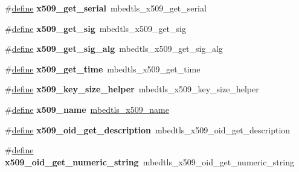 \begin{DoxyCompactItemize}
\item 
\mbox{\label{compat-1_83_8h_adda3ad994d9d311903524d777c44c93f}} 
\#\hyperlink{structdefine}{define} {\bfseries x509\+\_\+get\+\_\+serial}~mbedtls\+\_\+x509\+\_\+get\+\_\+serial
\item 
\mbox{\label{compat-1_83_8h_a9821ad162d9337ad1591910592a180b2}} 
\#\hyperlink{structdefine}{define} {\bfseries x509\+\_\+get\+\_\+sig}~mbedtls\+\_\+x509\+\_\+get\+\_\+sig
\item 
\mbox{\label{compat-1_83_8h_a510cd159e825e724613a6d24a8c54d0a}} 
\#\hyperlink{structdefine}{define} {\bfseries x509\+\_\+get\+\_\+sig\+\_\+alg}~mbedtls\+\_\+x509\+\_\+get\+\_\+sig\+\_\+alg
\item 
\mbox{\label{compat-1_83_8h_ad00bb2f2753ce699629001ed1289fdd0}} 
\#\hyperlink{structdefine}{define} {\bfseries x509\+\_\+get\+\_\+time}~mbedtls\+\_\+x509\+\_\+get\+\_\+time
\item 
\mbox{\label{compat-1_83_8h_a3727e5c02a342e3cabe62e6f2ad1b7b2}} 
\#\hyperlink{structdefine}{define} {\bfseries x509\+\_\+key\+\_\+size\+\_\+helper}~mbedtls\+\_\+x509\+\_\+key\+\_\+size\+\_\+helper
\item 
\mbox{\label{compat-1_83_8h_a850f40c258b0b2ae1df5209b3a737356}} 
\#\hyperlink{structdefine}{define} {\bfseries x509\+\_\+name}~\hyperlink{group__x509__module_ga2272228c7776102328df31623af3168c}{mbedtls\+\_\+x509\+\_\+name}
\item 
\mbox{\label{compat-1_83_8h_a875d90c75ebc55a691dca57036b429fa}} 
\#\hyperlink{structdefine}{define} {\bfseries x509\+\_\+oid\+\_\+get\+\_\+description}~mbedtls\+\_\+x509\+\_\+oid\+\_\+get\+\_\+description
\item 
\mbox{\label{compat-1_83_8h_af6be434020656372cbc33d85264ada31}} 
\#\hyperlink{structdefine}{define} {\bfseries x509\+\_\+oid\+\_\+get\+\_\+numeric\+\_\+string}~mbedtls\+\_\+x509\+\_\+oid\+\_\+get\+\_\+numeric\+\_\+string
\item 
\mbox{\label{compat-1_83_8h_ad3e6a7e7511b092174b3580385216ca7}} 

\end{DoxyCompactItemize}
